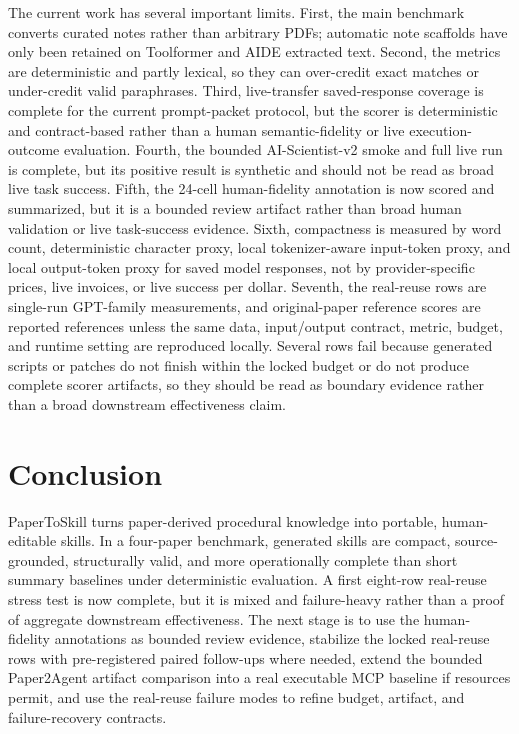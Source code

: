 \documentclass[letterpaper]{article}
\begin{document}
The current work has several important limits. First, the main benchmark
converts curated notes rather than arbitrary PDFs; automatic note scaffolds have
only been retained on Toolformer and AIDE extracted text. Second, the metrics
are deterministic and partly lexical, so they can over-credit exact matches or
under-credit valid paraphrases. Third, live-transfer saved-response coverage is
complete for the current prompt-packet protocol, but the scorer is
deterministic and contract-based rather than a human semantic-fidelity or live
execution-outcome evaluation. Fourth, the bounded AI-Scientist-v2 smoke and
full live run is complete, but its positive result is synthetic and should not
be read as broad live task success. Fifth, the 24-cell human-fidelity
annotation is now scored and summarized, but it is a bounded review artifact
rather than broad human validation or live task-success evidence. Sixth,
compactness is measured by word count, deterministic character proxy, local
tokenizer-aware input-token proxy, and local output-token proxy for saved model
responses, not by provider-specific prices, live invoices, or live success per
dollar. Seventh, the real-reuse rows are single-run GPT-family measurements,
and original-paper reference scores are reported references unless the same
data, input/output contract, metric, budget, and runtime setting are reproduced
locally. Several rows fail because generated scripts or patches do not finish
within the locked budget or do not produce complete scorer artifacts, so they
should be read as boundary evidence rather than a broad downstream
effectiveness claim.

\section{Conclusion}

PaperToSkill turns paper-derived procedural knowledge into portable,
human-editable skills. In a four-paper benchmark, generated skills are compact,
source-grounded, structurally valid, and more operationally complete than short
summary baselines under deterministic evaluation. A first eight-row real-reuse
stress test is now complete, but it is mixed and failure-heavy rather than a
proof of aggregate downstream effectiveness. The next stage is to use the
human-fidelity annotations as bounded review evidence, stabilize the locked
real-reuse rows with pre-registered paired follow-ups where needed, extend the bounded Paper2Agent artifact
comparison into a real executable MCP baseline if resources permit, and use
the real-reuse failure modes to refine budget, artifact, and failure-recovery
contracts.


\end{document}
